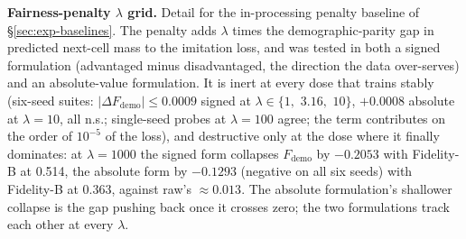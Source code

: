 \textbf{Fairness-penalty $\lambda$ grid.} Detail for the in-processing
penalty baseline of \S\ref{sec:exp-baselines}. The penalty adds $\lambda$
times the demo\-graph\-ic-parity gap in predicted next-cell mass to the
imitation loss, and was tested in
both a signed formulation (advantaged minus disadvantaged, the direction the
data over-serves) and an absolute-value formulation. It is inert at every
dose that trains stably (six-seed suites:
$|\Delta F_{\mathrm{demo}}| \le 0.0009$ signed at
$\lambda \in \{1,$ $3.16,$ $10\}$, $+0.0008$ absolute at $\lambda = 10$, all
n.s.; single-seed probes at $\lambda = 100$ agree; the term contributes on
the order of $10^{-5}$ of the loss), and destructive only at the dose where
it finally dominates: at $\lambda = 1000$ the signed form collapses
$F_{\mathrm{demo}}$ by $-0.2053$ with Fidelity-B at 0.514, the absolute form
by $-0.1293$ (negative on all six seeds) with Fidelity-B at 0.363, against raw's
$\approx 0.013$. The absolute formulation's shallower collapse is the gap
pushing back once it crosses zero; the two formulations track each other at
every $\lambda$.

